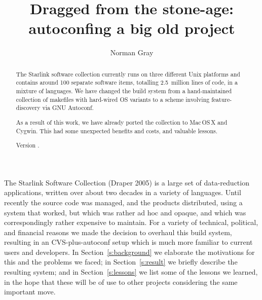 \documentclass{speauth}
\begin{document}


\title{Dragged from the stone-age: autoconfing a big old project}

\author{Norman Gray\footnotemark}

\noreceived{}
\norevised{}
\noaccepted{}



\begin{abstract}
The Starlink software collection currently runs on three different
Unix platforms and contains around 100 separate software items,
totalling 2.5~million lines of code, in a mixture of languages.  We
have changed the build system from a hand-maintained collection of
makefiles with hard-wired OS variants to a scheme involving
feature-discovery via GNU Autoconf.

As a result of this work, we have already ported the collection to
Mac\,OS\,X and Cygwin.  This had some unexpected benefits and costs, and
valuable lessons.

Version \RCSVersion.
\end{abstract}



The Starlink Software Collection (Draper 2005) is a large set of
data-reduction 
applications, written over about two decades in a variety of
languages.  Until recently the source code was managed, and the
products distributed, using a system that worked, but which was
rather ad hoc and opaque, and which was correspondingly rather
expensive to maintain.  For a variety of technical, political, and financial
reasons we made the decision to overhaul this build system, resulting
in an CVS-plus-autoconf setup which is much more familiar to current users and
developers.   In Section~\ref{s:background} we elaborate the
motivations for this and the problems we faced; in
Section~\ref{s:result} we briefly describe the resulting system; and
in Section~\ref{s:lessons} we list some of the lessons we learned, in
the hope that these will be of use to other projects considering the
same important move.
\end{document}

